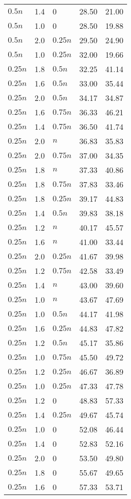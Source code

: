 \begin{tabular}{lllrr}
$0.5n$ & 1.4 & 0 &    28.50 &        21.00 \\
$0.5n$ & 1.0 & 0 &    28.50 &        19.88 \\
$0.5n$ & 2.0 & $0.25n$ &    29.50 &        24.90 \\
$0.5n$ & 1.0 & $0.25n$ &    32.00 &        19.66 \\
$0.25n$ & 1.8 & $0.5n$ &    32.25 &        41.14 \\
$0.25n$ & 1.6 & $0.5n$ &    33.00 &        35.44 \\
$0.25n$ & 2.0 & $0.5n$ &    34.17 &        34.87 \\
$0.25n$ & 1.6 & $0.75n$ &    36.33 &        46.21 \\
$0.25n$ & 1.4 & $0.75n$ &    36.50 &        41.74 \\
$0.25n$ & 2.0 & $n$ &    36.83 &        35.83 \\
$0.25n$ & 2.0 & $0.75n$ &    37.00 &        34.35 \\
$0.25n$ & 1.8 & $n$ &    37.33 &        40.86 \\
$0.25n$ & 1.8 & $0.75n$ &    37.83 &        33.46 \\
$0.25n$ & 1.8 & $0.25n$ &    39.17 &        44.83 \\
$0.25n$ & 1.4 & $0.5n$ &    39.83 &        38.18 \\
$0.25n$ & 1.2 & $n$ &    40.17 &        45.57 \\
$0.25n$ & 1.6 & $n$ &    41.00 &        33.44 \\
$0.25n$ & 2.0 & $0.25n$ &    41.67 &        39.98 \\
$0.25n$ & 1.2 & $0.75n$ &    42.58 &        33.49 \\
$0.25n$ & 1.4 & $n$ &    43.00 &        39.60 \\
$0.25n$ & 1.0 & $n$ &    43.67 &        47.69 \\
$0.25n$ & 1.0 & $0.5n$ &    44.17 &        41.98 \\
$0.25n$ & 1.6 & $0.25n$ &    44.83 &        47.82 \\
$0.25n$ & 1.2 & $0.5n$ &    45.17 &        35.86 \\
$0.25n$ & 1.0 & $0.75n$ &    45.50 &        49.72 \\
$0.25n$ & 1.2 & $0.25n$ &    46.67 &        36.89 \\
$0.25n$ & 1.0 & $0.25n$ &    47.33 &        47.78 \\
$0.25n$ & 1.2 & 0 &    48.83 &        57.33 \\
$0.25n$ & 1.4 & $0.25n$ &    49.67 &        45.74 \\
$0.25n$ & 1.0 & 0 &    52.08 &        46.44 \\
$0.25n$ & 1.4 & 0 &    52.83 &        52.16 \\
$0.25n$ & 2.0 & 0 &    53.50 &        49.80 \\
$0.25n$ & 1.8 & 0 &    55.67 &        49.65 \\
$0.25n$ & 1.6 & 0 &    57.33 &        53.71 \\
\bottomrule
\end{tabular}
